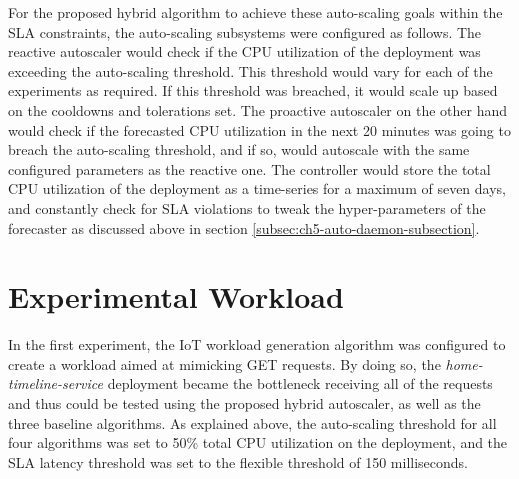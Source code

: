 For the proposed hybrid algorithm to achieve these auto-scaling goals within the SLA constraints, the auto-scaling subsystems were configured as follows. The reactive autoscaler would check if the CPU utilization of the deployment was exceeding the auto-scaling threshold. This threshold would vary for each of the experiments as required. If this threshold was breached, it would scale up based on the cooldowns and tolerations set. The proactive autoscaler on the other hand would check if the forecasted CPU utilization in the next 20 minutes was going to breach the auto-scaling threshold, and if so, would autoscale with the same configured parameters as the reactive one. The controller would store the total CPU utilization of the deployment as a time-series for a maximum of seven days, and constantly check for SLA violations to tweak the hyper-parameters of the forecaster as discussed above in section \ref{subsec:ch5-auto-daemon-subsection}.\par

\section{Experimental Workload}
\label{sec:ch6-exp-workload}

In the first experiment, the IoT workload generation algorithm was configured to create a workload aimed at mimicking GET requests. By doing so, the \textit{home-timeline-service} deployment became the bottleneck receiving all of the requests and thus could be tested using the proposed hybrid autoscaler, as well as the three baseline algorithms. As explained above, the auto-scaling threshold for all four algorithms was set to 50\% total CPU utilization on the deployment, and the SLA latency threshold was set to the flexible threshold of 150 milliseconds.\par

